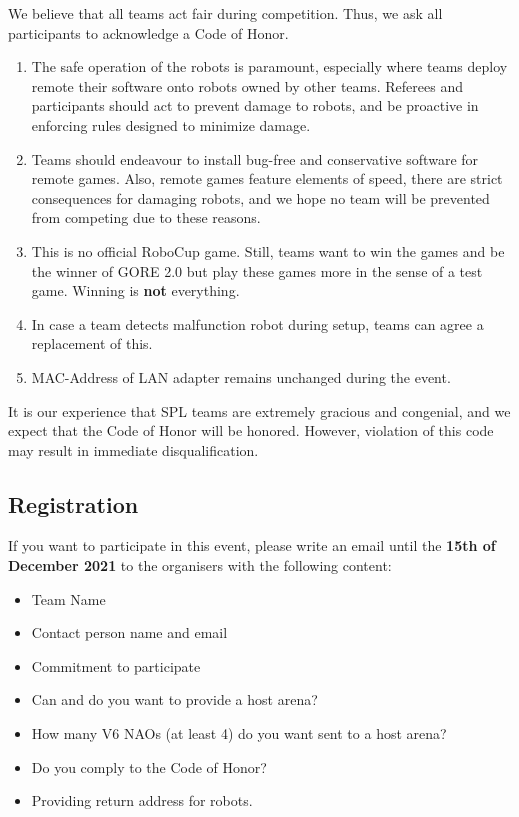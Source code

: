We believe that all teams act fair during competition. Thus, we ask all participants to acknowledge a Code of Honor.
\begin{enumerate}
    \item The safe operation of the robots is paramount, especially where teams deploy remote their software onto robots owned by other teams. Referees and participants should act to prevent damage to robots, and be proactive in enforcing rules  designed to minimize damage.
    \item Teams should endeavour to install bug-free and conservative software for remote games. Also, remote games feature elements of speed, there are strict consequences for damaging robots, and we hope no team will be prevented from competing due to these reasons.
    \item This is no official RoboCup game. Still, teams want to win the games and be the winner of GORE 2.0 but play these games more in the sense of a test game. Winning is \textbf{not} everything.
    \item In case a team detects malfunction robot during setup, teams can agree a replacement of this.
    \item MAC-Address of LAN adapter remains unchanged during the event.
\end{enumerate} 

It is our experience that SPL teams are extremely gracious and congenial, and we expect that the Code of Honor will be honored. However, violation of this code may result in immediate disqualification.

\subsection{Registration}

If you want to participate in this event, please write an email until the \textbf{15th of December 2021} to the organisers with the following content:
\begin{itemize}
    \item Team Name
    \item Contact person name and email
    \item Commitment to participate
    \item Can and do you want to provide a host arena?
    \item How many V6 NAOs (at least 4) do you want sent to a host arena?
    \item Do you comply to the Code of Honor?
    \item Providing return address for robots.
\end{itemize}

